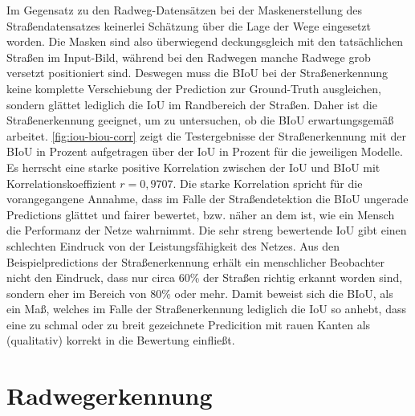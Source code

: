 Im Gegensatz zu den Radweg-Datensätzen bei der Maskenerstellung des Straßendatensatzes keinerlei Schätzung 
über die Lage der Wege eingesetzt worden. Die Masken sind also überwiegend deckungsgleich mit den tatsächlichen 
Straßen im Input-Bild, während bei den Radwegen manche Radwege grob versetzt positioniert sind. 
Deswegen muss die BIoU bei der Straßenerkennung keine komplette Verschiebung der Prediction zur Ground-Truth ausgleichen, 
sondern glättet lediglich die IoU im Randbereich der Straßen. Daher ist die Straßenerkennung geeignet, 
um zu untersuchen, ob die BIoU erwartungsgemäß arbeitet. \autoref{fig:iou-biou-corr} zeigt die Testergebnisse der 
Straßenerkennung mit der BIoU in Prozent aufgetragen über der IoU in Prozent für die jeweiligen Modelle. 
Es herrscht eine starke positive Korrelation zwischen der IoU und BIoU mit Korrelationskoeffizient $r = 0,9707$. 
Die starke Korrelation spricht für die vorangegangene Annahme, dass im Falle der Straßendetektion die BIoU 
ungerade Predictions glättet und fairer bewertet, bzw. näher an dem ist, wie ein Mensch die Performanz der 
Netze wahrnimmt. Die sehr streng bewertende IoU gibt einen schlechten Eindruck von der Leistungsfähigkeit des Netzes. 
Aus den Beispielpredictions der Straßenerkennung erhält ein menschlicher Beobachter nicht den Eindruck, 
dass nur circa 60\% der Straßen richtig erkannt worden sind, sondern eher im Bereich von 80\% oder mehr. 
Damit beweist sich die BIoU, als ein Maß, welches im Falle der Straßenerkennung lediglich die IoU so anhebt, 
dass eine zu schmal oder zu breit gezeichnete Predicition mit rauen Kanten als (qualitativ) korrekt in 
die Bewertung einfließt.  

\section{Radwegerkennung} \label{sec:disc:recog}

